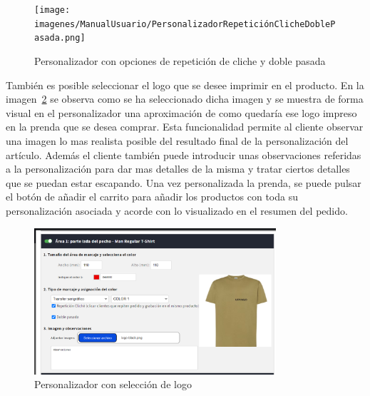 \documentclass[11pt]{article}
\begin{document}
\begin{figure}[H]
    \centering
    \texttt{[image: imagenes/ManualUsuario/PersonalizadorRepeticiónClicheDoblePasada.png]}
    \caption{\label{fig:PersonalizadorCheckboxes}Personalizador con opciones de repetición de cliche y doble pasada}
    \vspace{\fill}
\end{figure}

También es posible seleccionar el logo que se desee imprimir en el producto. En la imagen~\ref{fig:PersonalizadorLogo} se observa como se ha seleccionado dicha imagen y se muestra de forma visual en el personalizador una 
aproximación de como quedaría ese logo impreso en la prenda que se desea comprar. Esta funcionalidad permite al cliente observar una imagen lo mas realista posible del resultado final
de la personalización del artículo. Además el cliente también puede introducir unas observaciones referidas a la personalización para dar mas detalles de la misma y tratar ciertos detalles que se puedan
estar escapando. Una vez personalizada la prenda, se puede pulsar el botón de añadir el carrito para añadir los productos con toda su personalización asociada y acorde con
lo visualizado en el resumen del pedido.

\begin{figure}[H]
    \centering
    \includegraphics[width=0.8\textwidth]{imagenes/ManualUsuario/PersonalizadorLogoSeleccionado.png}
    \caption{\label{fig:PersonalizadorLogo}Personalizador con selección de logo}
    \vspace{\fill}
\end{figure}
\end{document}
